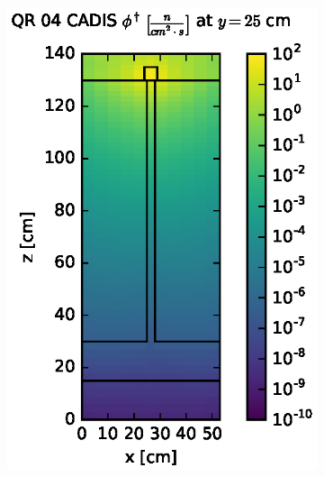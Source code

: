 \begin{figure}[!htb]
\centering
\begin{subfigure}{0.4\textwidth}
\includegraphics[max height=0.445\textheight]
{img/steel-plots/cad-adj/flux-qr04-slice.eps}
\end{subfigure} ~
\begin{subfigure}{0.4\textwidth}

\end{subfigure}
\end{figure}
